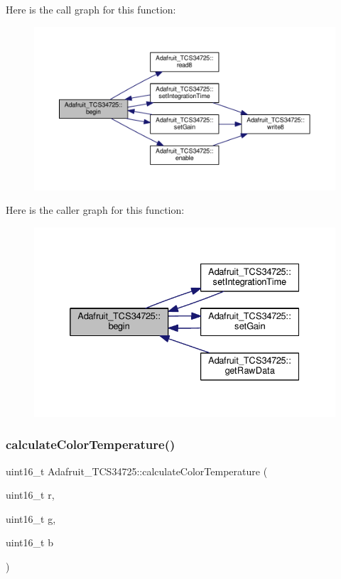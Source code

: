 Here is the call graph for this function\+:
\nopagebreak
\begin{figure}[H]
\begin{center}
\leavevmode
\includegraphics[width=350pt]{class_adafruit___t_c_s34725_a568d79b6382ac27010a8afc26cbdae79_cgraph}
\end{center}
\end{figure}
Here is the caller graph for this function\+:
\nopagebreak
\begin{figure}[H]
\begin{center}
\leavevmode
\includegraphics[width=332pt]{class_adafruit___t_c_s34725_a568d79b6382ac27010a8afc26cbdae79_icgraph}
\end{center}
\end{figure}
\mbox{\label{class_adafruit___t_c_s34725_a9c6c7ab8a84a47a65ff04a125bcfee92}} 
\subsubsection{\texorpdfstring{calculate\+Color\+Temperature()}{calculateColorTemperature()}}
{\footnotesize\ttfamily uint16\+\_\+t Adafruit\+\_\+\+T\+C\+S34725\+::calculate\+Color\+Temperature (\begin{DoxyParamCaption}\item[{uint16\+\_\+t}]{r,  }\item[{uint16\+\_\+t}]{g,  }\item[{uint16\+\_\+t}]{b }\end{DoxyParamCaption})}



